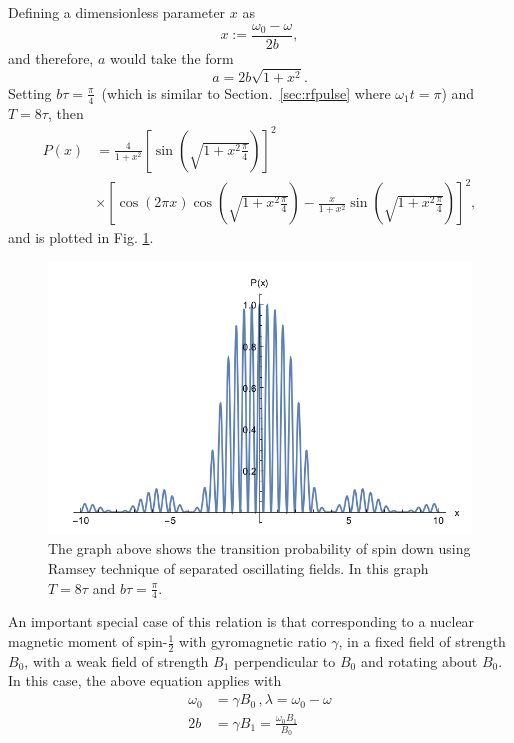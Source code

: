 Defining a dimensionless parameter $x$ as
%
\begin{equation}
x:= \frac{\omega_0 - \omega}{2b} , 
\end{equation}
and therefore, $a$ would take the form 
\begin{equation}
a= 2b \sqrt{1+x^2} .
\end{equation}
Setting $b\tau = \frac{\pi}{4}$~(which is similar to
Section.~\ref{sec:rfpulse} where $\omega_1 t= \pi$) and $T=8\tau$,
then
%
\begin{align}
  P(x) &= \frac{4}{1+x^2} \left[ \sin ( \sqrt{1+x^2 \frac{\pi}{4}}) \right]^2 \\ \nonumber
  & \times
\left[
\cos (2 \pi x) \cos (\sqrt{1+x^2 \frac{\pi}{4}}) - \frac{x}{1+x^2} \sin ( \sqrt{1+x^2 \frac{\pi}{4}}) \right] ^2 ,
\end{align}
%
and is plotted in Fig. \ref{fig:transprob}.
\begin{figure}[h!]
  \centering
  \includegraphics[width=.8\textwidth]{p.png}
  \caption{ The graph above shows the transition probability of spin
    down using Ramsey technique of separated oscillating fields. In
    this graph $T=8\tau$ and $ b \tau = \frac{\pi}{4}$. }
  \label{fig:transprob}
\end{figure}

An important special case of this relation is that corresponding to a
nuclear magnetic moment of spin-$\frac{1}{2}$ with gyromagnetic ratio
$\gamma$, in a fixed field of strength $B_0$, with a weak field of
strength $B_1$ perpendicular to $B_0$ and rotating about $B_0$. In
this case, the above equation applies with
\begin{align}
\omega_0 &= \gamma B_0 \, , \lambda=\omega_0 - \omega \\
2b &= \gamma B_1 =\frac{\omega_0 B_1}{B_0}
\end{align}
